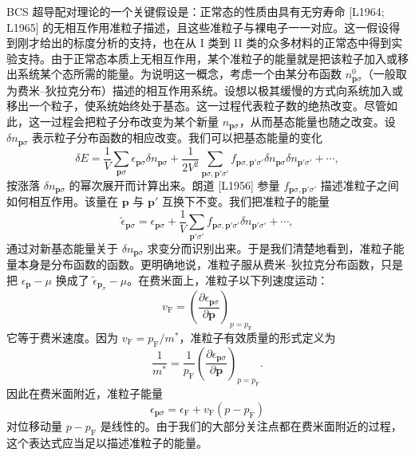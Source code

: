 BCS 超导配对理论的一个关键假设是：正常态的性质由具有无穷寿命 [L1964; L1965] 的无相互作用准粒子描述，且这些准粒子与裸电子一一对应。这一假设得到刚才给出的标度分析的支持，也在从 I 类到 II 类的众多材料的正常态中得到实验支持。由于正常态本质上无相互作用，某个准粒子的能量就是把该粒子加入或移出系统某个态所需的能量。为说明这一概念，考虑一个由某分布函数 $n^0_{\mathbf p\sigma}$（一般取为费米–狄拉克分布）描述的相互作用系统。设想以极其缓慢的方式向系统加入或移出一个粒子，使系统始终处于基态。这一过程代表粒子数的绝热改变。尽管如此，这一过程会把粒子分布改变为某个新量 $n_{\mathbf p\sigma}$，从而基态能量也随之改变。设 $\delta n_{\mathbf p\sigma}$ 表示粒子分布函数的相应改变。我们可以把基态能量的变化
\begin{equation*}
\delta E=\frac{1}{V}\sum_{\mathbf p\sigma}\epsilon_{\mathbf p\sigma}\delta n_{\mathbf p\sigma}+\frac{1}{2V^2}\sum_{\mathbf p\sigma,\mathbf p'\sigma'}f_{\mathbf p\sigma,\mathbf p'\sigma'}\delta n_{\mathbf p\sigma}\delta n_{\mathbf p'\sigma'}+\cdots, \tag{12.117}
\end{equation*}
按涨落 $\delta n_{\mathbf p\sigma}$ 的幂次展开而计算出来。朗道 [L1956] 参量 $f_{\mathbf p\sigma,\mathbf p'\sigma'}$ 描述准粒子之间如何相互作用。该量在 $\mathbf p$ 与 $\mathbf p'$ 互换下不变。我们把准粒子的能量
\begin{equation*}
\tilde\epsilon_{\mathbf p\sigma}=\epsilon_{\mathbf p\sigma}+\frac{1}{V}\sum_{\mathbf p'\sigma'}f_{\mathbf p\sigma,\mathbf p'\sigma'}\delta n_{\mathbf p'\sigma'}+\cdots, \tag{12.118}
\end{equation*}
通过对新基态能量关于 $\delta n_{\mathbf p\sigma}$ 求变分而识别出来。于是我们清楚地看到，准粒子能量本身是分布函数的函数。更明确地说，准粒子服从费米–狄拉克分布函数，只是把 $\epsilon_{\mathbf p}-\mu$ 换成了 $\tilde\epsilon_{\mathbf p_\sigma}-\mu$。在费米面上，准粒子以下列速度运动：
\begin{equation*}
v_{\mathrm F}=\left(\frac{\partial\epsilon_{\mathbf p\sigma}}{\partial\mathbf p}\right)_{p=p_{\mathrm F}} \tag{12.119}
\end{equation*}
它等于费米速度。因为 $v_{\mathrm F}=p_{\mathrm F}/m^*$，准粒子有效质量的形式定义为
\begin{equation*}
\frac{1}{m^*}=\frac{1}{p_{\mathrm F}}\left(\frac{\partial\epsilon_{\mathbf p\sigma}}{\partial\mathbf p}\right)_{p=p_{\mathrm F}}. \tag{12.120}
\end{equation*}
因此在费米面附近，准粒子能量
\begin{equation*}
\epsilon_{\mathbf p\sigma}=\epsilon_{\mathrm F}+v_{\mathrm F}(p-p_{\mathrm F}) \tag{12.121}
\end{equation*}
对位移动量 $p-p_{\mathrm F}$ 是线性的。由于我们的大部分关注点都在费米面附近的过程，这个表达式应当足以描述准粒子的能量。

